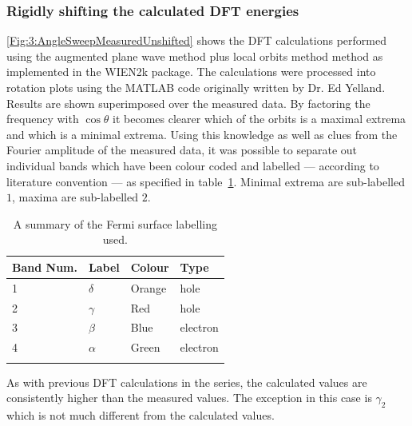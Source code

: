 \clearpage

\subsubsection{Rigidly shifting the calculated DFT energies}

\Fig\ref{Fig:3:AngleSweepMeasuredUnshifted} shows the DFT calculations performed using the augmented plane wave method plus local orbits method method as implemented in the WIEN2k package\cite{Blaha2001}. The calculations were processed into rotation plots using the MATLAB code originally written by Dr. Ed Yelland. Results are shown superimposed over the measured data. By factoring the frequency with $\cos{\theta}$ it becomes clearer which of the orbits is a maximal extrema and which is a minimal extrema. Using this knowledge as well as clues from the Fourier amplitude of the measured data, it was possible to separate out individual bands which have been colour coded and labelled --- according to literature convention --- as specified in table~\ref{Table:3:BandNaming}. Minimal extrema are sub-labelled $1$, maxima are sub-labelled $2$.
\begin{table}
    \begin{center}
        \caption{A summary of the Fermi surface labelling used.}
        \begin{tabular}[htbp]{llll}
\toprule
Band Num.  & Label & Colour    & Type \\
\midrule
1   & $\delta$  & Orange    & hole \\
2   & $\gamma$  & Red   & hole \\
3   & $\beta$   & Blue  & electron \\
4   & $\alpha$  & Green & electron \\
\bottomrule
        \label{Table:3:BandNaming}
        \end{tabular}
    \end{center}
\end{table}
As with previous DFT calculations in the \BaFePAs series, the calculated values are consistently higher than the measured values. The exception in this case is $\gamma_2$ which is not much different from the calculated values.
